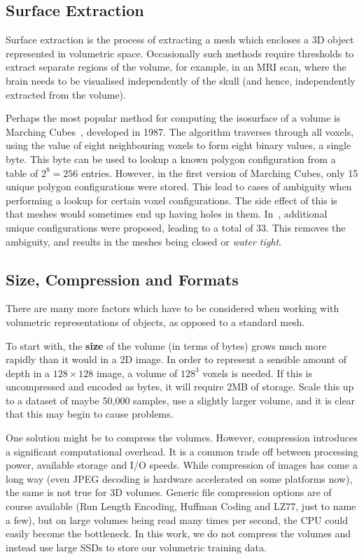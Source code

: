 \subsection{Surface Extraction}

Surface extraction is the process of extracting a mesh which encloses
a 3D object represented in volumetric space. Occasionally such methods
require thresholds to extract separate regions of the volume, for
example, in an MRI scan, where the brain  needs to be visualised
independently of the skull (and hence, independently extracted from
the volume).

Perhaps the most popular method for computing the isosurface of a
volume is Marching Cubes~\cite{lorensen1987marching}, developed in
1987. The algorithm traverses through all voxels, using the value of
eight neighbouring voxels to form eight binary values, a single
byte. This byte can be used to lookup a known polygon configuration
from a table of $2^8 = 256$ entries. However, in the first version of
Marching Cubes, only 15 unique polygon configurations were
stored. This lead to cases of ambiguity when performing a lookup for
certain voxel configurations. The side effect of this is that meshes
would sometimes end up having holes in
them. In~\cite{chernyaev1995marching}, additional unique
configurations were proposed, leading to a total of 33. This removes
the ambiguity, and results in the meshes being closed or \textit{water
  tight}.


\subsection{Size, Compression and Formats}
\label{sec:background:volstorage}

There are many more factors which have to be considered when working
with volumetric representations of objects, as opposed to a standard
mesh.

To start with, the \textbf{size} of the volume (in terms of bytes)
grows much more rapidly than it would in a 2D image. In order to
represent a sensible amount of depth in a $128 \times 128$ image, a
volume of $128^3$ voxels is needed. If this is uncompressed and
encoded as bytes, it will require 2MB of storage. Scale this up to a
dataset of maybe 50,000 samples, use a slightly larger volume, and it
is clear that this may begin to cause problems.

One solution might be to compress the volumes. However, compression
introduces a significant computational overhead. It is a common trade
off between processing power, available storage and I/O speeds. While
compression of images has come a long way (even JPEG decoding is
hardware accelerated on some platforms now), the same is not true for
3D volumes. Generic file compression options are of course available
(Run Length Encoding, Huffman Coding and LZ77, just to name a few),
but on large volumes being read many times per second, the CPU could
easily become the bottleneck. In this work, we do not compress the
volumes and instead use large SSDs to store our volumetric training
data.

